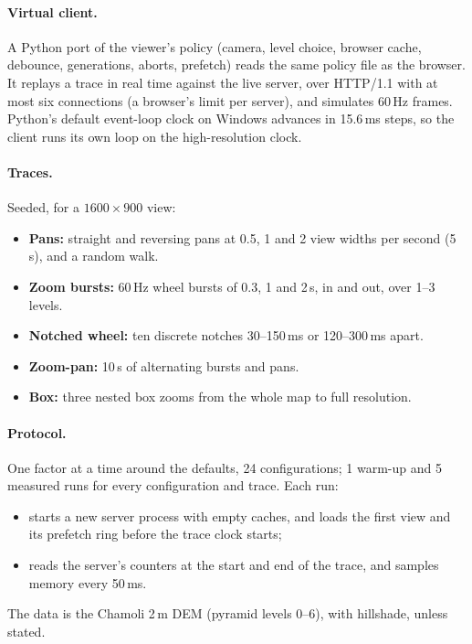\documentclass[11pt,a4paper]{article}
\begin{document}
\paragraph{Virtual client.} A Python port of the viewer's policy (camera, level choice, browser cache, debounce,
generations, aborts, prefetch) reads the same policy file as the browser. It replays a trace in real time against
the live server, over HTTP/1.1 with at most six connections (a browser's limit per server), and simulates 60\,Hz
frames. Python's default event-loop clock on Windows advances in 15.6\,ms steps, so the client runs its own loop on
the high-resolution clock.

\paragraph{Traces.} Seeded, for a $1600\times900$ view:
\begin{itemize}
  \item \textbf{Pans:} straight and reversing pans at 0.5, 1 and 2 view widths per second (5\,s), and a random walk.
  \item \textbf{Zoom bursts:} 60\,Hz wheel bursts of 0.3, 1 and 2\,s, in and out, over 1--3 levels.
  \item \textbf{Notched wheel:} ten discrete notches 30--150\,ms or 120--300\,ms apart.
  \item \textbf{Zoom-pan:} 10\,s of alternating bursts and pans.
  \item \textbf{Box:} three nested box zooms from the whole map to full resolution.
\end{itemize}

\paragraph{Protocol.} One factor at a time around the defaults, 24 configurations; 1 warm-up and 5 measured runs
for every configuration and trace. Each run:
\begin{itemize}
  \item starts a new server process with empty caches, and loads the first view and its prefetch ring before the
  trace clock starts;
  \item reads the server's counters at the start and end of the trace, and samples memory every 50\,ms.
\end{itemize}
The data is the Chamoli 2\,m DEM (pyramid levels 0--6), with hillshade, unless stated.
\end{document}
